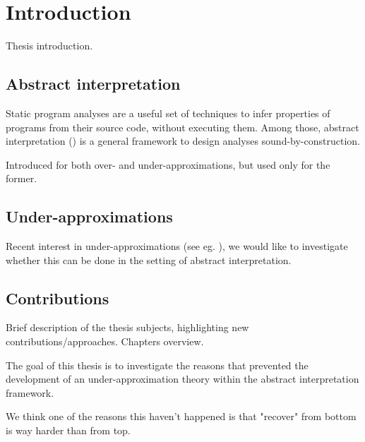 \chapter{Introduction}

Thesis introduction.

\section{Abstract interpretation}
Static program analyses are a useful set of techniques to infer properties of programs from their source code, without executing them. Among those, abstract interpretation (\cite{cousot-77}\cite{cousot-79}) is a general framework to design analyses sound-by-construction.

Introduced for both over- and under-approximations, but used only for the former.\cite{cousot-77}\cite{cousot-79}

\begin{example}[Intervals]\label{intr:ex:intervals}
\end{example}

\section{Under-approximations}
Recent interest in under-approximations (see eg. \cite{ohearn-incorrectness-logic}), we would like to investigate whether this can be done in the setting of abstract interpretation.

\section{Contributions}
Brief description of the thesis subjects, highlighting new contributions/approaches. Chapters overview.

The goal of this thesis is to investigate the reasons that prevented the development of an under-approximation theory within the abstract interpretation framework.

We think one of the reasons this haven't happened is that "recover" from bottom is way harder than from top.
